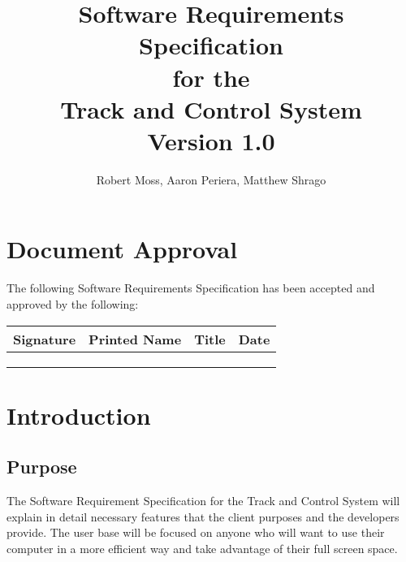 \documentclass[titlepage]{article}
\begin{document}
\title{
\textbf{
Software Requirements Specification}
\protect\\
for the
\protect\\
\textbf{
Track and Control System}
\protect\\
{\small Version 1.0}}

\author{Robert Moss, Aaron Periera, Matthew Shrago}
\maketitle

\section*{Document Approval}

The following Software Requirements Specification has been accepted and approved by the following:

\begin{center}
    \begin{tabularx}{\textwidth}{ |X|X|X|X| }
    \hline
    \textbf{Signature} & \textbf{Printed Name} & \textbf{Title} & \textbf{Date} \\ \hline
     &  &  &  \\ \hline
     &  &  &  \\ \hline
     &  &  &  \\ \hline
    \end{tabularx}
\end{center}

\newpage
\tableofcontents{} 
\newpage

\section{Introduction}

\subsection{Purpose}
The Software Requirement Specification for the Track and Control System will explain in detail necessary features that the client purposes and the developers provide. The user base will be focused on anyone who will want to use their computer in a more efficient way and take advantage of their full screen space. 
\end{document}
